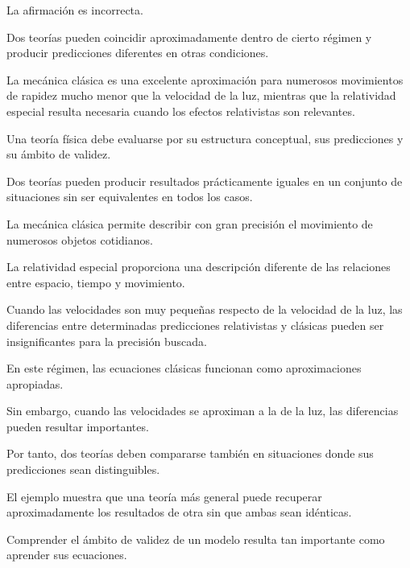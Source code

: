 \begin{respuesta}
La afirmación es incorrecta.

Dos teorías pueden coincidir aproximadamente dentro de cierto régimen y producir predicciones diferentes en otras condiciones.

La mecánica clásica es una excelente aproximación para numerosos movimientos de rapidez mucho menor que la velocidad de la luz, mientras que la relatividad especial resulta necesaria cuando los efectos relativistas son relevantes.
\end{respuesta}

\begin{explicacion}
Una teoría física debe evaluarse por su estructura conceptual, sus predicciones y su ámbito de validez.

Dos teorías pueden producir resultados prácticamente iguales en un conjunto de situaciones sin ser equivalentes en todos los casos.

La mecánica clásica permite describir con gran precisión el movimiento de numerosos objetos cotidianos.

La relatividad especial proporciona una descripción diferente de las relaciones entre espacio, tiempo y movimiento.

Cuando las velocidades son muy pequeñas respecto de la velocidad de la luz, las diferencias entre determinadas predicciones relativistas y clásicas pueden ser insignificantes para la precisión buscada.

En este régimen, las ecuaciones clásicas funcionan como aproximaciones apropiadas.

Sin embargo, cuando las velocidades se aproximan a la de la luz, las diferencias pueden resultar importantes.

Por tanto, dos teorías deben compararse también en situaciones donde sus predicciones sean distinguibles.

El ejemplo muestra que una teoría más general puede recuperar aproximadamente los resultados de otra sin que ambas sean idénticas.

Comprender el ámbito de validez de un modelo resulta tan importante como aprender sus ecuaciones.
\end{explicacion}


